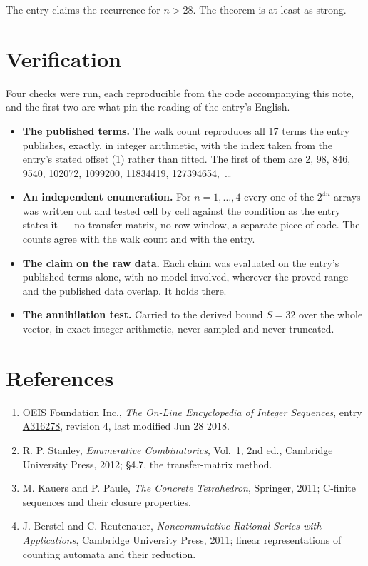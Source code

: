 \documentclass[11pt]{article}
\theoremstyle{definition}
\begin{document}
The entry claims the recurrence for $n > 28$. The theorem is at least as strong.

\section{Verification}

Four checks were run, each reproducible from the code accompanying this note, and the first two are what pin the reading of the entry's English.

\begin{itemize}

\item {\bfseries The published terms.} The walk count reproduces all 17 terms the entry publishes, exactly, in integer arithmetic, with the index taken from the entry's stated offset (1) rather than fitted. The first of them are 2, 98, 846, 9540, 102072, 1099200, 11834419, 127394654,~\dots

\item {\bfseries An independent enumeration.} For $n = 1,\dots,4$ every one of the $2^{4n}$ arrays was written out and tested cell by cell against the condition as the entry states it --- no transfer matrix, no row window, a separate piece of code. The counts agree with the walk count and with the entry.

\item {\bfseries The claim on the raw data.} Each claim was evaluated on the entry's published terms alone, with no model involved, wherever the proved range and the published data overlap. It holds there.

\item {\bfseries The annihilation test.} Carried to the derived bound $S = 32$ over the whole vector, in exact integer arithmetic, never sampled and never truncated.

\end{itemize}

\section{References}

\begin{enumerate}

\item OEIS Foundation Inc., \emph{The On-Line Encyclopedia of Integer Sequences}, entry \href{https://oeis.org/A316278}{A316278}, revision 4, last modified Jun 28 2018.

\item R. P. Stanley, \emph{Enumerative Combinatorics}, Vol.~1, 2nd ed., Cambridge University Press, 2012; \S4.7, the transfer-matrix method.

\item M. Kauers and P. Paule, \emph{The Concrete Tetrahedron}, Springer, 2011; C-finite sequences and their closure properties.

\item J. Berstel and C. Reutenauer, \emph{Noncommutative Rational Series with Applications}, Cambridge University Press, 2011; linear representations of counting automata and their reduction.

\end{enumerate}
\end{document}
